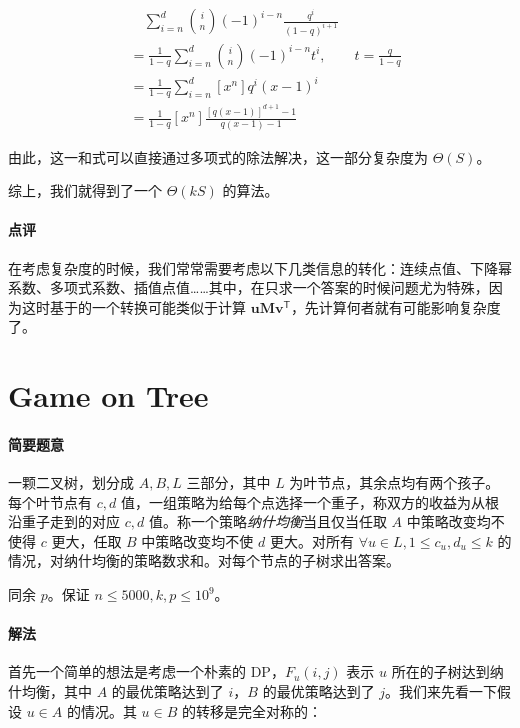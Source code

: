 \documentclass[12pt]{ctexart}
\theoremstyle{theorem}
\theoremstyle{theorem}
\begin{document}
\begin{align*}
&\quad \sum_{i=n}^{d}\binom i n (-1)^{i-n} \frac{q^i}{(1-q)^{i+1}}\\
&= \frac 1{1-q}\sum_{i=n}^{d}\binom i n (-1)^{i-n} t^i, \qquad t=\frac q{1-q}\\
&= \frac 1{1-q}\sum_{i=n}^{d} [x^n] q^i(x-1)^i\\
&= \frac 1{1-q}[x^n] \frac{[q(x-1)]^{d+1}-1}{q(x-1)-1}
\end{align*}

由此，这一和式可以直接通过多项式的除法解决，这一部分复杂度为 $\Theta(S)$。

综上，我们就得到了一个 $\Theta(kS)$ 的算法。

\paragraph{点评} 在考虑复杂度的时候，我们常常需要考虑以下几类信息的转化：连续点值、下降幂系数、多项式系数、插值点值……其中，在只求一个答案的时候问题尤为特殊，因为这时基于的一个转换可能类似于计算 $\mathbf {uM}\mathbf v^{\mathsf T}$，先计算何者就有可能影响复杂度了。

\newpage

\section{Game on Tree}

\paragraph{简要题意}

一颗二叉树，划分成 $A,B,L$ 三部分，其中 $L$ 为叶节点，其余点均有两个孩子。每个叶节点有 $c,d$ 值，一组策略为给每个点选择一个重子，称双方的收益为从根沿重子走到的对应 $c,d$ 值。称一个策略\emph{纳什均衡}当且仅当任取 $A$ 中策略改变均不使得 $c$ 更大，任取 $B$ 中策略改变均不使 $d$ 更大。对所有 $\forall u\in L,1\le c_u,d_u\le k$ 的情况，对纳什均衡的策略数求和。对每个节点的子树求出答案。

同余 $p$。保证 $n\le 5000, k,p\le 10^9$。

\paragraph{解法}

首先一个简单的想法是考虑一个朴素的 DP，$F_u(i, j)$ 表示 $u$ 所在的子树达到纳什均衡，其中 $A$ 的最优策略达到了 $i$，$B$ 的最优策略达到了 $j$。我们来先看一下假设 $u\in A$ 的情况。其 $u\in B$ 的转移是完全对称的：
\end{document}
